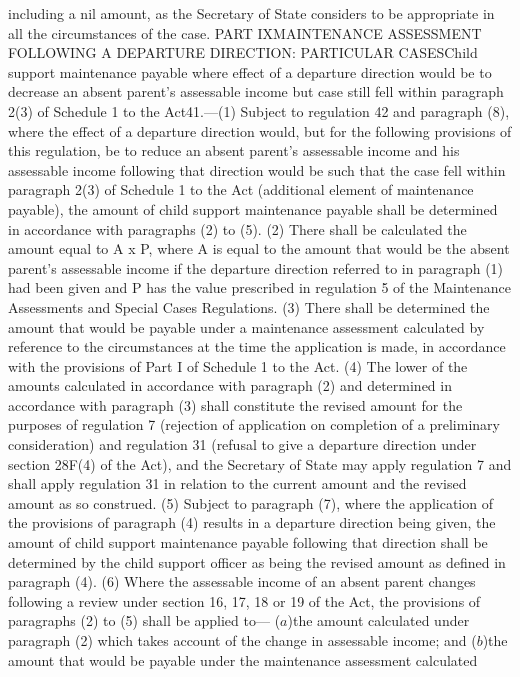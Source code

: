\documentclass[a4paper]{article}
\begin{document}
including a nil amount, as the Secretary of State considers to be appropriate in
all the circumstances of the case.
PART IXMAINTENANCE ASSESSMENT FOLLOWING A DEPARTURE DIRECTION: PARTICULAR
CASESChild support maintenance payable where effect of a departure direction
would be to decrease an absent parent’s assessable income but case still fell
within paragraph 2(3) of Schedule 1 to the Act41.—(1) Subject to regulation 42
and paragraph (8), where the effect of a departure direction would, but for the
following provisions of this regulation, be to reduce an absent parent’s
assessable income and his assessable income following that direction would be
such that the case fell within paragraph 2(3) of Schedule 1 to the Act
(additional element of maintenance payable), the amount of child support
maintenance payable shall be determined in accordance with paragraphs (2) to
(5).
(2) There shall be calculated the amount equal to A x P, where A is equal to the
amount that would be the absent parent’s assessable income if the departure
direction referred to in paragraph (1) had been given and P has the value
prescribed in regulation 5 of the Maintenance Assessments and Special Cases
Regulations.
(3) There shall be determined the amount that would be payable under a
maintenance assessment calculated by reference to the circumstances at the time
the application is made, in accordance with the provisions of Part I of Schedule
1 to the Act.
(4) The lower of the amounts calculated in accordance with paragraph (2) and
determined in accordance with paragraph (3) shall constitute the revised amount
for the purposes of regulation 7 (rejection of application on completion of a
preliminary consideration) and regulation 31 (refusal to give a departure
direction under section 28F(4) of the Act), and the Secretary of State may apply
regulation 7 and shall apply regulation 31 in relation to the current amount and
the revised amount as so construed.
(5) Subject to paragraph (7), where the application of the provisions of
paragraph (4) results in a departure direction being given, the amount of child
support maintenance payable following that direction shall be determined by the
child support officer as being the revised amount as defined in paragraph (4).
(6) Where the assessable income of an absent parent changes following a review
under section 16, 17, 18 or 19 of the Act, the provisions of paragraphs (2) to
(5) shall be applied to—
($a$)the amount calculated under paragraph (2) which takes account of the change
in assessable income; and
($b$)the amount that would be payable under the maintenance assessment calculated
\end{document}
